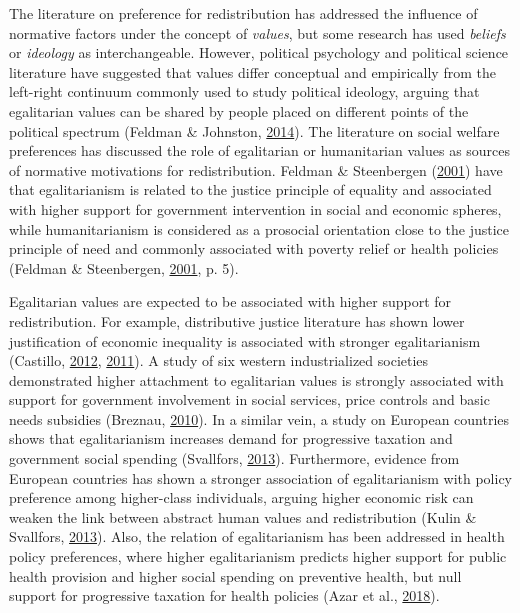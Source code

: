 \documentclass[
  12pt,
]{book}
\begin{document}
The literature on preference for redistribution has addressed the influence of normative factors under the concept of \emph{values}, but some research has used \emph{beliefs} or \emph{ideology} as interchangeable. However, political psychology and political science literature have suggested that values differ conceptual and empirically from the left-right continuum commonly used to study political ideology, arguing that egalitarian values can be shared by people placed on different points of the political spectrum (Feldman \& Johnston, \protect\hyperlink{ref-feldman_understanding_2014}{2014}). The literature on social welfare preferences has discussed the role of egalitarian or humanitarian values as sources of normative motivations for redistribution. Feldman \& Steenbergen (\protect\hyperlink{ref-feldman_humanitarian_2001}{2001}) have that egalitarianism is related to the justice principle of equality and associated with higher support for government intervention in social and economic spheres, while humanitarianism is considered as a prosocial orientation close to the justice principle of need and commonly associated with poverty relief or health policies (Feldman \& Steenbergen, \protect\hyperlink{ref-feldman_humanitarian_2001}{2001}, p. 5).

Egalitarian values are expected to be associated with higher support for redistribution. For example, distributive justice literature has shown lower justification of economic inequality is associated with stronger egalitarianism (Castillo, \protect\hyperlink{ref-Castillo2012b_multidimentional}{2012}, \protect\hyperlink{ref-Castillo2011}{2011}). A study of six western industrialized societies demonstrated higher attachment to egalitarian values is strongly associated with support for government involvement in social services, price controls and basic needs subsidies (Breznau, \protect\hyperlink{ref-breznau_economic_2010}{2010}). In a similar vein, a study on European countries shows that egalitarianism increases demand for progressive taxation and government social spending (Svallfors, \protect\hyperlink{ref-svallfors_government_2013}{2013}). Furthermore, evidence from European countries has shown a stronger association of egalitarianism with policy preference among higher-class individuals, arguing higher economic risk can weaken the link between abstract human values and redistribution (Kulin \& Svallfors, \protect\hyperlink{ref-Kulin2013}{2013}). Also, the relation of egalitarianism has been addressed in health policy preferences, where higher egalitarianism predicts higher support for public health provision and higher social spending on preventive health, but null support for progressive taxation for health policies (Azar et al., \protect\hyperlink{ref-Azaretal2018}{2018}).
\end{document}
